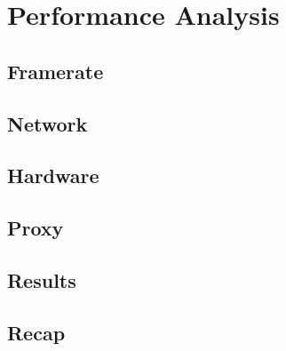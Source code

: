 \chapter{Performance Analysis}\label{ch:performance}

\section{Framerate}\label{sc:performance:framerate}

\section{Network}\label{sc:performance:network}

\section{Hardware}\label{sc:performance:hardware}

\section{Proxy}\label{sc:performance:proxy}

\section{Results}\label{sc:performance:results}

\section{Recap}\label{sc:performance:recap}
